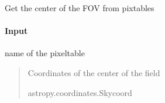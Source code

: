 \documentclass[letterpaper,10pt,english]{sphinxmanual}
\begin{document}
\begin{fulllineitems}
\label{\detokenize{api/pymusepipe:pymusepipe.util_image.get_centre_from_pixtable}}
\pysigstartsignatures
{}
\pysigstopsignatures
\sphinxAtStartPar
Get the center of the FOV from pixtables


\paragraph{Input}
\label{\detokenize{api/pymusepipe:id147}}\begin{description}
\sphinxAtStartPar
name of the pixeltable

\end{description}
\begin{quote}\begin{description}
\sphinxAtStartPar
{} \textendash{} Coordinates of the center of the field

\sphinxAtStartPar
astropy.coordinates.Skycoord

\end{description}\end{quote}

\end{fulllineitems}

\end{document}
